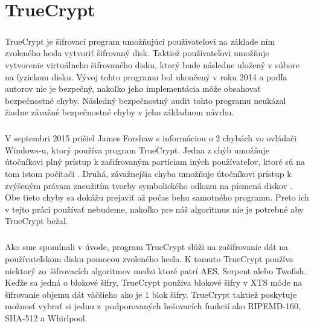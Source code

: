 \chapter{TrueCrypt}
\paragraph{}
TrueCrypt je šifrovací program umožňujúci používateľovi na základe ním zvoleného hesla vytvoriť šifrovaný disk. Taktiež používateľovi umožňuje vytvorenie virtuálneho šifrovaného disku, ktorý bude následne uložený v súbore na fyzickom disku. Vývoj tohto programu bol ukončený v roku 2014 a podľa autorov nie je bezpečný, nakoľko jeho implementácia môže obsahovať bezpečnostné chyby. Následný bezpečnostný audit tohto programu neukázal žiadne závažné bezpečnostné chyby v jeho základnom návrhu. 

\paragraph{}
V septembri 2015 prišiel James Forshaw s informáciou o 2 chybách vo ovládači Windows-u, ktorý používa program TrueCrypt. Jedna z chýb umožňuje útočníkovi plný prístup k zašifrovaným partíciam iných používateľov, ktoré sú na tom istom počítači \cite{issue1}. Druhá, závažnejšia chyba umožňuje útočníkovi prístup k zvýšeným právam zneužitím tvorby symbolického odkazu na písmená diskov \cite{issue2}. Obe tieto chyby sa dokážu prejaviť až počas behu samotného programu. Preto ich v tejto práci používať nebudeme, nakoľko pre náš algoritmus nie je potrebné aby TrueCrypt bežal.

\paragraph{}
Ako sme spomínali v úvode, program TrueCrypt slúži na zašifrovanie dát na používateľskom disku pomocou zvoleného hesla. K tomuto TrueCrypt používa niektorý zo~šifrovacích algoritmov medzi ktoré patrí AES, Serpent alebo Twofish. Keďže sa jedná o blokové šifry, TrueCrypt používa blokové šifry v XTS móde na šifrovanie objemu dát väčšieho ako je 1 blok šifry. TrueCrypt taktiež poskytuje možnosť vybrať si jednu z~podporovaných hešovacích funkcií ako RIPEMD-160, SHA-512 a Whirlpool.

